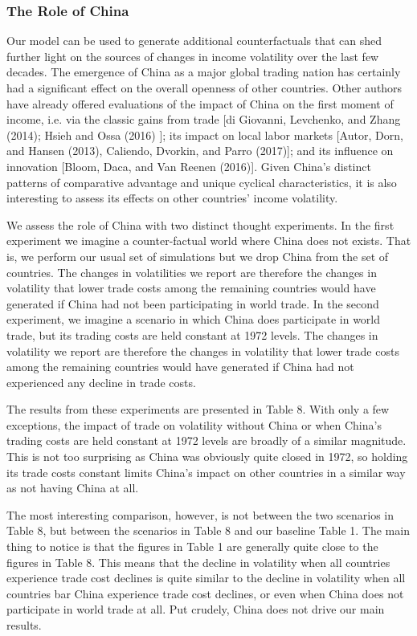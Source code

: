 \documentclass[12pt]{article}
\begin{document}
\subsubsection{The Role of China}

Our model can be used to generate additional counterfactuals that can shed
further light on the sources of changes in income volatility over the last
few decades. The emergence of China as a major global trading nation has
certainly had a significant effect on the overall openness of other
countries. Other authors have already offered evaluations of the impact of
China on the first moment of income, i.e. via the classic gains from trade
[di Giovanni, Levchenko, and Zhang (2014); Hsieh and Ossa (2016) ]; its
impact on local labor markets [Autor, Dorn, and Hansen (2013), Caliendo,
Dvorkin, and Parro (2017)]; and its influence on innovation [Bloom, Daca,
and Van Reenen (2016)]. Given China's distinct patterns of comparative
advantage and unique cyclical characteristics, it is also interesting to
assess its effects on other countries' income volatility.

We assess the role of China with two distinct thought experiments. In the
first experiment we imagine a counter-factual world where China does not
exists. That is, we perform our usual set of simulations but we drop China
from the set of countries. The changes in volatilities we report are
therefore the changes in volatility that lower trade costs among the
remaining countries would have generated if China had not been participating
in world trade. In the second experiment, we imagine a scenario in which
China does participate in world trade, but its trading costs are held
constant at 1972 levels. The changes in volatility we report are therefore
the changes in volatility that lower trade costs among the remaining
countries would have generated if China had not experienced any decline in
trade costs.

The results from these experiments are presented in Table 8. With only a few
exceptions, the impact of trade on volatility without China or when China's
trading costs are held constant at 1972 levels are broadly of a similar
magnitude. This is not too surprising as China was obviously quite closed in
1972, so holding its trade costs constant limits China's impact on other
countries in a similar way as not having China at all.

The most interesting comparison, however, is not between the two scenarios
in Table 8, but between the scenarios in Table 8 and our baseline Table 1.
The main thing to notice is that the figures in Table 1 are generally quite
close to the figures in Table 8. This means that the decline in volatility
when all countries experience trade cost declines is quite similar to the
decline in volatility when all countries bar China experience trade cost
declines, or even when China does not participate in world trade at all. Put
crudely, China does not drive our main results.
\end{document}
